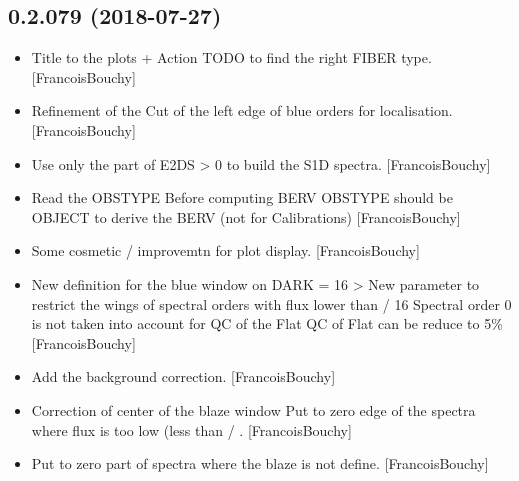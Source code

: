 \documentclass[a4paper,10pt,english]{report}
\begin{document}
\subsection{0.2.079 (2018-07-27)}
\label{\detokenize{misc/changelog:id384}}\begin{itemize}
\item {} 
Title to the plots + Action TODO to find the right FIBER type.
{[}FrancoisBouchy{]}

\item {} 
Refinement of the Cut of the left edge of blue orders for
localisation. {[}FrancoisBouchy{]}

\item {} 
Use only the part of E2DS \textgreater{} 0 to build the S1D spectra.
{[}FrancoisBouchy{]}

\item {} 
Read the OBSTYPE Before computing BERV OBSTYPE should be OBJECT to
derive the BERV (not for Calibrations) {[}FrancoisBouchy{]}

\item {} 
Some cosmetic / improvemtn for plot display. {[}FrancoisBouchy{]}

\item {} 
New definition for the blue window on DARK  = 16 \textendash{}\textgreater{}
New parameter to restrict the wings of spectral orders with flux lower
than  / 16 Spectral order 0 is not taken into account for
QC of the Flat QC of Flat can be reduce to 5\% {[}FrancoisBouchy{]}

\item {} 
Add the background correction. {[}FrancoisBouchy{]}

\item {} 
Correction of center of the blaze window Put to zero edge of the
spectra where flux is too low (less than  /
. {[}FrancoisBouchy{]}

\item {} 
Put to zero part of spectra where the blaze is not define.
{[}FrancoisBouchy{]}

\end{itemize}
\end{document}

